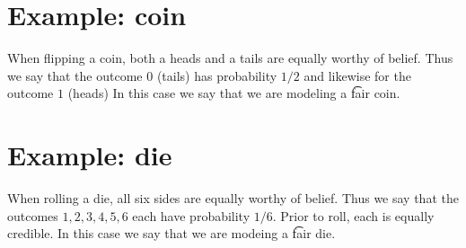 \section*{Example: coin}

When flipping a coin, both a heads and a tails are equally worthy of belief.
Thus we say that the outcome $0$ (tails) has probability $1/2 $ and likewise for the outcome $1$ (heads)
In this case we say that we are modeling a \t{fair coin}.

\section*{Example: die}

When rolling a die, all six sides are equally worthy of belief.
Thus we say that the outcomes $1, 2, 3, 4, 5, 6$ each have probability $1/6 $.
Prior to roll, each is equally credible.
In this case we say that we are modeing a \t{fair die}.
